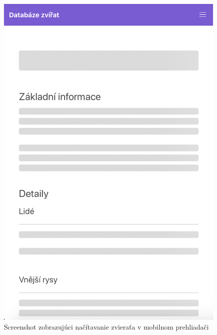 \begin{figure}[H]
	\includegraphics[width=1.0\textwidth]{media/priloha/mobil/3.png}
	\caption{Screenshot zobrazujúci načítavanie zvieraťa v mobilnom prehliadači}
\end{figure}

